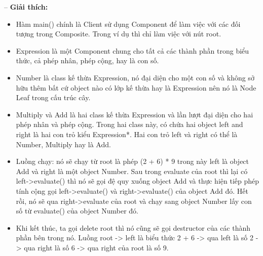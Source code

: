 

-- \textbf{Giải thích:}
\begin{itemize}
    \item[$+$] Hàm main() chính là Client sử dụng Component để làm việc với các đối tượng trong Composite. 
               Trong ví dụ thì chỉ làm việc với nút root.
    \item[$+$] Expression là một Component chung cho tất cả các thành phần trong biểu thức, cả phép nhân, phép cộng, hay là con số.
    \item[$+$] Number là class kế thừa Expression, nó đại diện cho một con số và không sở hữu thêm bất cứ object nào có lớp kế thừa hay là Expression 
               nên nó là Node Leaf trong cấu trúc cây.
    \item[$+$] Multiply và Add là hai class kế thừa Expression và lần lượt đại diện cho hai phép nhân và phép cộng. 
               Trong hai class này, có chứa hai object left and right là hai con trỏ kiểu Expression*. 
               Hai con trỏ left và right có thể là Number, Multiply hay là Add.
    \item[$+$] Luồng chạy: nó sẽ chạy từ root là phép (2 + 6) * 9 trong này left là object Add và right là một object Number. 
               Sau trong evaluate của root thì lại có left->evaluate() thì nó sẽ gọi đệ quy xuống object Add và thực hiện tiếp phép tính cộng gọi left->evaluate() và right->evaluate() của object Add đó. 
               Hết rồi, nó sẽ qua right->evaluate của root và chạy sang object Number lấy con số từ evaluate() của object Number đó.
    \item[$+$] Khi kết thúc, ta gọi delete root thì nó cũng sẽ gọi destructor của các thành phần bên trong nó. 
               Luồng root -> left là biểu thức 2 + 6 -> qua left là số 2 -> qua right là số 6 -> qua right của root là số 9.
\end{itemize}